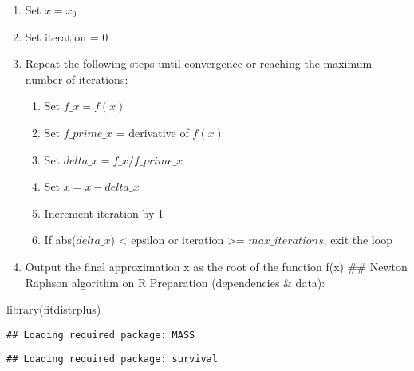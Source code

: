 \documentclass[
]{article}
\newenvironment{Shaded}{\begin{snugshade}}{\end{snugshade}}
\newcommand{\FunctionTok}[1]{\textcolor[rgb]{0.00,0.00,0.00}{#1}}
\newcommand{\NormalTok}[1]{#1}
\providecommand{\tightlist}{%
  \setlength{\itemsep}{0pt}\setlength{\parskip}{0pt}}
\begin{document}
\begin{enumerate}
\def\labelenumi{\arabic{enumi}.}
\tightlist
\item
  Set \(x = x_0\)
\item
  Set iteration = 0
\item
  Repeat the following steps until convergence or reaching the maximum
  number of iterations:

  \begin{enumerate}
  \def\labelenumii{\arabic{enumii}.}
  \tightlist
  \item
    Set \(f\_x = f(x)\)\\
  \item
    Set \(f\_prime\_x\) = derivative of \(f(x)\)
  \item
    Set \(delta\_x = f\_x / f\_prime\_x\)
  \item
    Set \(x = x - delta\_x\)
  \item
    Increment iteration by 1
  \item
    If abs(\(delta\_x\)) \textless{} epsilon or iteration \textgreater=
    \(max\_iterations\), exit the loop
  \end{enumerate}
\item
  Output the final approximation x as the root of the function f(x) \#\#
  Newton Raphson algorithm on R Preparation (dependencies \& data):
\end{enumerate}

\begin{Shaded}
\begin{Highlighting}[]
\FunctionTok{library}\NormalTok{(fitdistrplus)}
\end{Highlighting}
\end{Shaded}

\begin{verbatim}
## Loading required package: MASS
\end{verbatim}

\begin{verbatim}
## Loading required package: survival
\end{verbatim}
\end{document}
